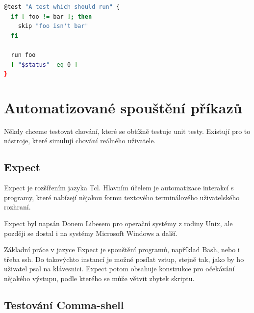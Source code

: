 \documentclass[thesis=M,czech]{FITthesis}[2012/06/26]
\begin{document}
\begin{minipage}{\linewidth}
\begin{lstlisting}[language=bash, caption={Bats}, label={lst:bats}]
@test "A test which should run" {
  if [ foo != bar ]; then
    skip "foo isn't bar"
  fi

  run foo
  [ "$status" -eq 0 ]
}
\end{lstlisting}
\end{minipage}




%
\section{Automatizované spouštění příkazů}

Někdy chceme testovat chování, které se obtížně testuje unit testy. Existují pro to nástroje, které simulují chování reálného uživatele.


\subsection{Expect}

Expect je rozšířením jazyka Tcl. Hlavním účelem je automatizace interakcí s programy, které nabízejí nějakou formu textového terminálového uživatelského rozhraní.

Expect byl napsán Donem Libesem pro operační systémy z rodiny Unix, ale později se dostal i na systémy Microsoft Windows a další.

Základní práce v jazyce Expect je spouštění programů, například Bash, nebo i třeba ssh. Do takovýchto instancí je možné posílat vstup, stejně tak, jako by ho uživatel psal na klávesnici. Expect potom obsahuje konstrukce pro očekávání nějakého výstupu, podle kterého se může větvit zbytek skriptu.



\subsection{Testování Comma-shell}
\end{document}
